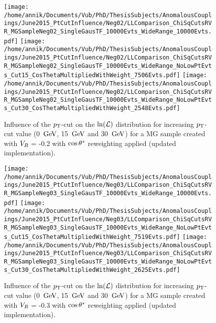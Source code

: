 \begin{figure}[h!t]
 \centering
 \texttt{[image: /home/annik/Documents/Vub/PhD/ThesisSubjects/AnomalousCouplings/June2015\_PtCutInfluence/Neg02/LLComparison\_ChiSqCutsRVR\_MGSampleNeg02\_SingleGausTF\_10000Evts\_WideRange\_10000Evts.pdf]}
 \texttt{[image: /home/annik/Documents/Vub/PhD/ThesisSubjects/AnomalousCouplings/June2015\_PtCutInfluence/Neg02/LLComparison\_ChiSqCutsRVR\_MGSampleNeg02\_SingleGausTF\_10000Evts\_WideRange\_NoLowPtEvts\_Cut15\_CosThetaMultipliedWithWeight\_7506Evts.pdf]}
 \texttt{[image: /home/annik/Documents/Vub/PhD/ThesisSubjects/AnomalousCouplings/June2015\_PtCutInfluence/Neg02/LLComparison\_ChiSqCutsRVR\_MGSampleNeg02\_SingleGausTF\_10000Evts\_WideRange\_NoLowPtEvts\_Cut30\_CosThetaMultipliedWithWeight\_2548Evts.pdf]}
 \caption{Influence of the $p_{\textrm T}$-cut on the $\ln(\mathcal{L})$ distribution for increasing $p_{\textrm T}$-cut value (0 $\, \mathrm{GeV}$, 15 $\, \mathrm{GeV}$ and 30 $\, \mathrm{GeV}$) for a MG sample created with $V_{R}$ = -0.2 with $\cos \theta^{*}$ reweighting applied (updated implementation).}
 \label{fig::CosThetaNeg02Update}
\end{figure}

\begin{figure}[h!t]
 \centering
 \texttt{[image: /home/annik/Documents/Vub/PhD/ThesisSubjects/AnomalousCouplings/June2015\_PtCutInfluence/Neg03/LLComparison\_ChiSqCutsRVR\_MGSampleNeg03\_SingleGausTF\_10000Evts\_WideRange\_10000Evts.pdf]}
 \texttt{[image: /home/annik/Documents/Vub/PhD/ThesisSubjects/AnomalousCouplings/June2015\_PtCutInfluence/Neg03/LLComparison\_ChiSqCutsRVR\_MGSampleNeg03\_SingleGausTF\_10000Evts\_WideRange\_NoLowPtEvts\_Cut15\_CosThetaMultipliedWithWeight\_7519Evts.pdf]}
 \texttt{[image: /home/annik/Documents/Vub/PhD/ThesisSubjects/AnomalousCouplings/June2015\_PtCutInfluence/Neg03/LLComparison\_ChiSqCutsRVR\_MGSampleNeg03\_SingleGausTF\_10000Evts\_WideRange\_NoLowPtEvts\_Cut30\_CosThetaMultipliedWithWeight\_2625Evts.pdf]}
 \caption{Influence of the $p_{\textrm T}$-cut on the $\ln(\mathcal{L})$ distribution for increasing $p_{\textrm T}$-cut value (0 $\, \mathrm{GeV}$, 15 $\, \mathrm{GeV}$ and 30 $\, \mathrm{GeV}$) for a MG sample created with $V_{R}$ = -0.3 with $\cos \theta^{*}$ reweighting applied (updated implementation).}
 \label{fig::CosThetaNeg03Update}
\end{figure}

